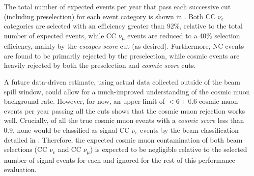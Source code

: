 The total number of expected events per year that pass each successive cut (including
preselection) for each event category is shown in . Both CC $\nu_{e}$
categories are selected with an efficiency greater than 92\%, relative to the total number of
expected events, while CC $\nu_{\mu}$ events are reduced to a 40\% selection efficiency, mainly by
the \emph{escapes score} cut (as desired). Furthermore, NC events are found to be primarily
rejected by the preselection, while cosmic events are heavily rejected by both the preselection
and \emph{cosmic score} cuts.

A future data-driven estimate, using actual \chipsfive data collected outside of the \numi beam
spill window, could allow for a much-improved understanding of the cosmic muon background rate.
However, for now, an upper limit of $<6\pm0.6$ cosmic muon events per year passing all the cuts
shows that the cosmic muon rejection works well. Crucially, of all the true cosmic muon events
with a \emph{cosmic score} less than $0.9$, none would be classified as signal CC $\nu_{e}$ events
by the beam classification detailed in . Therefore, the expected
cosmic muon contamination of both beam selections (CC $\nu_{e}$ and  CC $\nu_{\mu}$) is expected
to be negligible relative to the selected number of signal events for each and ignored for the
rest of this performance evaluation.


